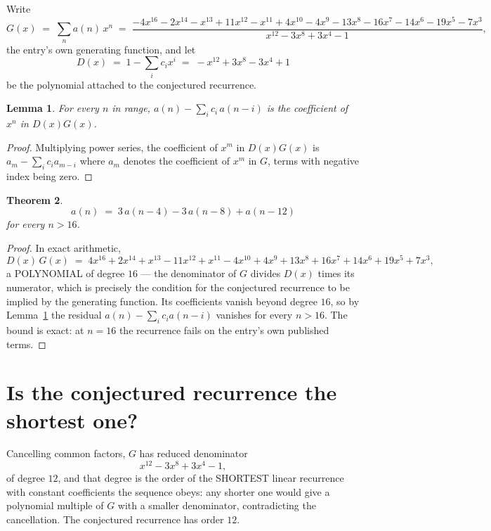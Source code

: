 \documentclass[11pt,a4paper]{article}
\theoremstyle{plain}
\newtheorem{theorem}{Theorem}
\newtheorem{lemma}[theorem]{Lemma}
\theoremstyle{definition}
\begin{document}
Write
\[
G(x)\;=\;\sum_{n}a(n)\,x^{n}\;=\;\frac{- 4 x^{16} - 2 x^{14} - x^{13} + 11 x^{12} - x^{11} + 4 x^{10} - 4 x^{9} - 13 x^{8} - 16 x^{7} - 14 x^{6} - 19 x^{5} - 7 x^{3}}{x^{12} - 3 x^{8} + 3 x^{4} - 1},
\]
the entry's own generating function, and let
\[
D(x)\;=\;1-\sum_i c_i x^{i}\;=\;- x^{12} + 3 x^{8} - 3 x^{4} + 1
\]
be the polynomial attached to the conjectured recurrence.

\begin{lemma}\label{lem:key}
For every $n$ in range, $a(n)-\sum_i c_i\,a(n-i)$ is the coefficient of $x^{n}$ in
$D(x)G(x)$.
\end{lemma}

\begin{proof}
Multiplying power series, the coefficient of $x^{m}$ in $D(x)G(x)$ is
$a_m-\sum_i c_i a_{m-i}$ where $a_m$ denotes the coefficient of $x^{m}$ in $G$, terms with
negative index being zero.
\end{proof}

\begin{theorem}
\[
a(n)\;=\;3\,a(n-4) - 3\,a(n-8) + a(n-12)
\]
for every $n>16$.
\end{theorem}

\begin{proof}
In exact arithmetic,
\[
D(x)\,G(x)\;=\;4 x^{16} + 2 x^{14} + x^{13} - 11 x^{12} + x^{11} - 4 x^{10} + 4 x^{9} + 13 x^{8} + 16 x^{7} + 14 x^{6} + 19 x^{5} + 7 x^{3},
\]
a POLYNOMIAL of degree $16$ --- the denominator of $G$ divides $D(x)$ times its numerator,
which is precisely the condition for the conjectured recurrence to be implied by the
generating function. Its coefficients vanish beyond degree $16$, so by
Lemma~\ref{lem:key} the residual $a(n)-\sum_ic_ia(n-i)$ vanishes for every
$n>16$. The bound is exact: at $n=16$ the recurrence fails on the entry's own published terms.
\end{proof}

\section{Is the conjectured recurrence the shortest one?}

Cancelling common factors, $G$ has reduced denominator
\[
x^{12} - 3 x^{8} + 3 x^{4} - 1,
\]
of degree $12$, and that degree is the order of the SHORTEST linear recurrence with
constant coefficients the sequence obeys: any shorter one would give a polynomial multiple of
$G$ with a smaller denominator, contradicting the cancellation. The conjectured recurrence has
order $12$.
\end{document}
